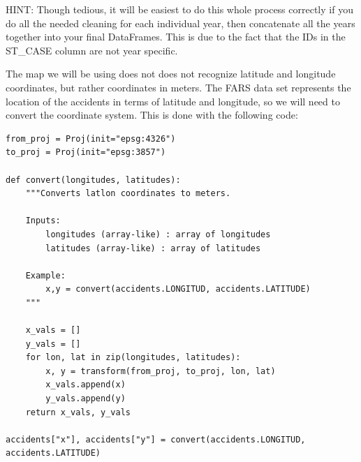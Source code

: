 \begin{problem}
\begin{info}
HINT: Though tedious, it will be easiest to do this whole process correctly if
you do all the needed cleaning for each individual year, then concatenate all
the years together into your final DataFrames. This is due to the fact that
the IDs in the ST\_CASE column are not year specific.
\end{info}
\end{problem}

\begin{problem} \label{prob:convert}
The map we will be using does not does not recognize latitude and longitude
coordinates, but rather coordinates in meters. The FARS data set represents
the location of the accidents in terms of latitude and longitude, so we will
need to convert the coordinate system. This is done with the following code:

\begin{lstlisting}
from_proj = Proj(init="epsg:4326")
to_proj = Proj(init="epsg:3857")

def convert(longitudes, latitudes):
    """Converts latlon coordinates to meters.

    Inputs:
        longitudes (array-like) : array of longitudes
        latitudes (array-like) : array of latitudes

    Example:
        x,y = convert(accidents.LONGITUD, accidents.LATITUDE)
    """

    x_vals = []
    y_vals = []
    for lon, lat in zip(longitudes, latitudes):
        x, y = transform(from_proj, to_proj, lon, lat)
        x_vals.append(x)
        y_vals.append(y)
    return x_vals, y_vals

accidents["x"], accidents["y"] = convert(accidents.LONGITUD, accidents.LATITUDE)
\end{lstlisting}
\end{problem}

